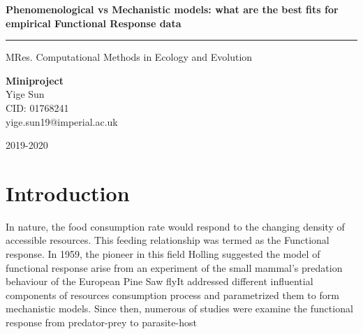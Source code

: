 \documentclass[11pt, a4paper]{article}
\newcommand\wordcount{}
\begin{document}
 
	
	\begin{titlepage} 
		\centering 
		
		
		\vspace*{\baselineskip} 
		
		\vspace{0.75\baselineskip} %
		
		{\LARGE \textbf{Phenomenological vs Mechanistic models: what are the best fits for empirical Functional Response data}} %
		
		\vspace{0.1\baselineskip} %
		
		\rule{\textwidth}{1.6pt} %
		
		\vspace{1\baselineskip} %
		MRes. Computational Methods in Ecology and Evolution
		
		{\large \textbf{Miniproject}}\\ %

		\vspace*{2\baselineskip} %
		{\Large Yige Sun} \\%
		CID: 01768241\\
		yige.sun19@imperial.ac.uk\\
		\vspace*{1\baselineskip}
		\vfill %
		
		{\LARGE 2019-2020} 
		\vspace{1\baselineskip}
	\end{titlepage}

\linenumbers
\section{Introduction}
In nature, the food consumption rate would respond to the changing density of accessible resources. This feeding relationship was termed as the Functional response\cite{Holling1959}\cite{Holling1959b}\cite{Jeschke2004}. In 1959, the pioneer in this field Holling suggested the model of functional response arise from an experiment of the small mammal's predation behaviour of the European Pine Saw fly\cite{Holling1959}It addressed different influential components of resources consumption process and parametrized them to form mechanistic models. Since then, numerous of studies were examine the functional response from predator-prey to parasite-host\cite{Jeschke2002}  
\end{document}
